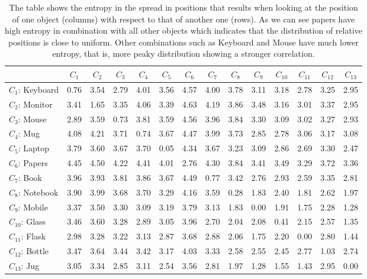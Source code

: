\documentclass[letterpaper, 10 pt, conference]{ieeeconf}  %
\begin{document}
\begin{table}
\begin{center}
\begin{tabular}{|l||c|c|c|c|c|c|c|c|c|c|c|c|c|}
\hline
& $C_{1}$ & $C_{2}$ & $C_{3}$ & $C_{4}$ & $C_{5}$ & $C_{6}$ & $C_{7}$ & $C_{8}$ & $C_{9}$ & $C_{10}$ & $C_{11}$ & $C_{12}$ & $C_{13}$\\ \hline \hline
$C_1$: Keyboard & 0.76 & 3.54 & 2.79 & 4.01 & 3.56 & 4.57 & 4.00 & 3.78 & 3.11 & 3.18 & 2.78 & 3.25 & 2.95 \\ \hline
$C_2$: Monitor & 3.41 & 1.65 & 3.35 & 4.06 & 3.39 & 4.63 & 4.19 & 3.86 & 3.48 & 3.16 & 3.01 & 3.37 & 2.95 \\ \hline
$C_3$: Mouse & 2.89 & 3.59 & 0.73 & 3.81 & 3.59 & 4.56 & 3.96 & 3.84 & 3.30 & 3.09 & 3.02 & 3.27 & 2.93 \\ \hline
$C_4$: Mug & 4.08 & 4.21 & 3.71 & 0.74 & 3.67 & 4.47 & 3.99 & 3.73 & 2.85 & 2.78 & 3.06 & 3.17 & 3.08 \\ \hline
$C_5$: Laptop & 3.79 & 3.60 & 3.67 & 3.70 & 0.05 & 4.34 & 3.67 & 3.23 & 3.09 & 2.86 & 2.69 & 3.30 & 2.47 \\ \hline
$C_6$: Papers & 4.45 & 4.50 & 4.22 & 4.41 & 4.01 & 2.76 & 4.30 & 3.84 & 3.41 & 3.49 & 3.29 & 3.72 & 3.36 \\ \hline
$C_7$: Book & 3.96 & 3.93 & 3.81 & 3.86 & 3.67 & 4.49 & 0.77 & 3.42 & 2.76 & 2.93 & 2.59 & 3.35 & 2.81 \\ \hline
$C_8$: Notebook & 3.90 & 3.99 & 3.68 & 3.70 & 3.29 & 4.16 & 3.59 & 0.28 & 1.83 & 2.40 & 1.81 & 2.62 & 1.97 \\ \hline
$C_9$: Mobile & 3.37 & 3.50 & 3.30 & 3.09 & 3.19 & 3.79 & 3.13 & 1.83 & 0.00 & 1.91 & 1.75 & 2.28 & 1.28 \\ \hline
$C_{10}$: Glass & 3.46 & 3.60 & 3.28 & 2.89 & 3.05 & 3.96 & 2.70 & 2.04 & 2.08 & 0.41 & 2.15 & 2.57 & 1.35 \\ \hline
$C_{11}$: Flask & 2.98 & 3.28 & 3.22 & 3.13 & 2.87 & 3.68 & 2.88 & 2.06 & 1.75 & 2.20 & 0.00 & 2.80 & 1.44 \\ \hline
$C_{12}$: Bottle & 3.47 & 3.64 & 3.44 & 3.42 & 3.17 & 4.03 & 3.33 & 2.58 & 2.55 & 2.45 & 2.77 & 1.03 & 2.74 \\ \hline
$C_{13}$: Jug & 3.05 & 3.34 & 2.85 & 3.11 & 2.54 & 3.56 & 2.81 & 1.97 & 1.28 & 1.55 & 1.43 & 2.95 & 0.00 \\ \hline
\end{tabular}
\label{fig:entropy}
\caption{The table shows the entropy in the spread in positions that results when looking at the position of one object (columns) with respect to that of another one (rows). As we can see papers have high entropy in combination with all other objects which indicates that the distribution of relative positions is close to uniform. Other combinations such as Keyboard and Mouse have much lower entropy, that is, more peaky distribution showing a stronger correlation.}
\end{center}
\end{table}
\end{document}
